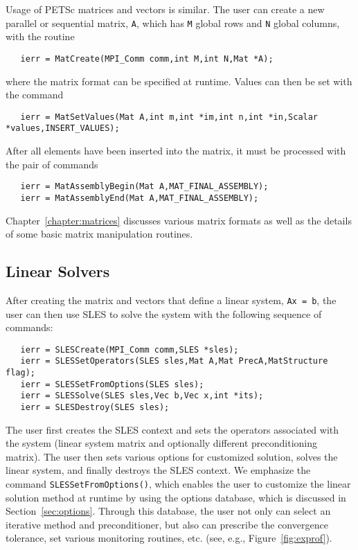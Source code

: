 Usage of PETSc matrices and vectors is similar.  
The user can create a new parallel or sequential matrix, {\tt A}, which
has {\tt M} global rows and {\tt N} global columns, with the routine
\begin{verbatim}
   ierr = MatCreate(MPI_Comm comm,int M,int N,Mat *A);
\end{verbatim}
where the matrix format can be specified at runtime.
Values can then be set with the command
\begin{verbatim}
   ierr = MatSetValues(Mat A,int m,int *im,int n,int *in,Scalar *values,INSERT_VALUES);
\end{verbatim}
After  all elements have been inserted into the
matrix, it must be processed with the pair of commands
 
\begin{verbatim}
   ierr = MatAssemblyBegin(Mat A,MAT_FINAL_ASSEMBLY);
   ierr = MatAssemblyEnd(Mat A,MAT_FINAL_ASSEMBLY);
\end{verbatim}
Chapter~\ref{chapter:matrices} discusses various matrix formats as
well as the details of some basic matrix manipulation routines.

\subsection*{Linear Solvers}

After creating the matrix and vectors that define a linear system,
{\tt Ax = b}, the user can then use SLES to solve the system 
with the following sequence of commands: 
 
  
\begin{verbatim}
   ierr = SLESCreate(MPI_Comm comm,SLES *sles); 
   ierr = SLESSetOperators(SLES sles,Mat A,Mat PrecA,MatStructure flag);
   ierr = SLESSetFromOptions(SLES sles);
   ierr = SLESSolve(SLES sles,Vec b,Vec x,int *its);
   ierr = SLESDestroy(SLES sles);
\end{verbatim}
The user first creates the SLES context and sets the operators
associated with the system (linear system matrix and optionally different
preconditioning matrix).  The user then sets various options for
customized solution, solves the linear system, and finally destroys
the SLES context.  We emphasize the command {\tt SLESSetFromOptions()}, 
which enables the user to customize the linear solution
method at runtime by using the options database, which is discussed in
Section~\ref{sec:options}. Through this database, the user not only
can select an iterative method and preconditioner, but also can prescribe
the convergence tolerance, set various monitoring routines, etc.
(see, e.g., Figure~\ref{fig:exprof}).

